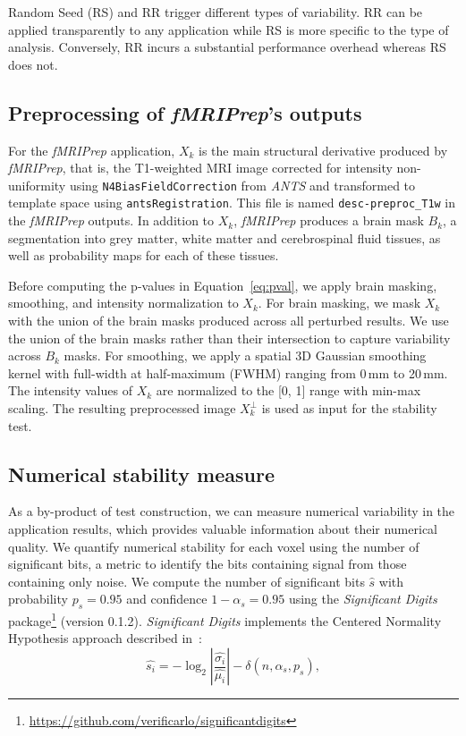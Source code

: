 \documentclass[lettersize,journal]{IEEEtran}
\newcommand{\fmriprep}{\emph{fMRIPrep}\xspace}
\newcommand{\fwhm}{\textsc{FWHM}}
\begin{document}
{Random Seed (RS) and RR trigger different types of variability. RR can be applied transparently to any application while RS is more specific to the type of analysis. Conversely, RR incurs a substantial performance overhead whereas RS does not.

\subsection{Preprocessing of \fmriprep's outputs}
\label{subsec:preprocessing}

For the \fmriprep application, $X_k$ is the main structural derivative produced by \fmriprep, that is, the T1-weighted MRI image corrected for intensity non-uniformity using \texttt{N4BiasFieldCorrection} from \emph{ANTS} and transformed to template space using \texttt{antsRegistration}. This file is named \texttt{desc-preproc\_T1w} in the \fmriprep outputs. In addition to $X_k$, \fmriprep produces a brain mask $B_k$, a segmentation into grey matter, white matter and cerebrospinal fluid tissues, as well as probability maps for each of these tissues.

Before computing the p-values in Equation~\ref{eq:pval}, we apply brain masking, smoothing, and intensity normalization to $X_k$. For brain masking, we mask $X_k$ with the union of the brain masks produced across all perturbed results. We use the union of the brain masks rather than their intersection to capture variability across $B_k$ masks.
For smoothing, we apply a spatial 3D Gaussian smoothing kernel with full-width at half-maximum (\fwhm) ranging from 0\,mm to 20\,mm.
The intensity values of $X_k$ are normalized to the [0, 1] range with min-max scaling.
The resulting preprocessed image $X_k^\perp$ is used as input for the stability test.

\subsection{Numerical stability measure}
\label{subsec:sigbits}

As a by-product of test construction, we can measure numerical variability in the application results, which provides valuable information about their numerical quality.
We quantify numerical stability for each voxel using the number of significant bits, a metric to identify the bits containing signal from those containing only noise. We compute the number of significant bits $\hat{s}$ with probability $p_s=0.95$ and confidence $1-\alpha_s=0.95$ using the \emph{Significant Digits} package\footnote{\url{https://github.com/verificarlo/significantdigits}} (version 0.1.2).
\emph{Significant Digits} implements the Centered Normality Hypothesis approach described in~\cite{sohier2021confidence}:
\[
  \hat{s_i} = -\log_2 \left| \frac{\hat{\sigma_i}}{\hat{\mu_i}} \right| - \delta(n, \alpha_s, p_s),
\]

}
\end{document}

